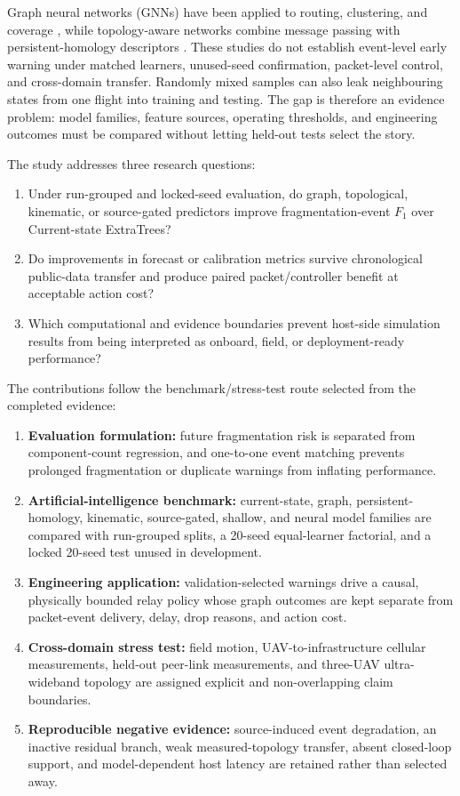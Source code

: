 \documentclass[final,5p,times,twocolumn]{elsarticle}
\begin{document}
Graph neural networks (GNNs) have been applied to routing, clustering, and coverage
\cite{lu2023uav,song2025gnnppor,ye2022multi}, while topology-aware networks combine
message passing with persistent-homology descriptors
\cite{hofer2017deep,carriere2020perslay}. These studies do not establish
event-level early warning under matched learners, unused-seed confirmation, packet-level
control, and cross-domain transfer. Randomly mixed samples can also leak neighbouring states
from one flight into training and testing. The gap is therefore an evidence problem: model
families, feature sources, operating thresholds, and engineering outcomes must be compared
without letting held-out tests select the story.

The study addresses three research questions:
\begin{enumerate}
  \item Under run-grouped and locked-seed evaluation, do graph, topological, kinematic, or
  source-gated predictors improve fragmentation-event $F_1$ over Current-state ExtraTrees?
  \item Do improvements in forecast or calibration metrics survive chronological public-data
  transfer and produce paired packet/controller benefit at acceptable action cost?
  \item Which computational and evidence boundaries prevent host-side simulation results from
  being interpreted as onboard, field, or deployment-ready performance?
\end{enumerate}

The contributions follow the benchmark/stress-test route selected from the completed
evidence:
\begin{enumerate}
  \item \textbf{Evaluation formulation:} future fragmentation risk is separated from
  component-count regression, and one-to-one event matching prevents prolonged fragmentation
  or duplicate warnings from inflating performance.
  \item \textbf{Artificial-intelligence benchmark:} current-state, graph,
  persistent-homology, kinematic, source-gated, shallow, and neural model families are
  compared with run-grouped splits, a 20-seed equal-learner factorial, and a locked 20-seed
  test unused in development.
  \item \textbf{Engineering application:} validation-selected warnings drive a causal,
  physically bounded relay policy whose graph outcomes are kept separate from packet-event
  delivery, delay, drop reasons, and action cost.
  \item \textbf{Cross-domain stress test:} field motion, UAV-to-infrastructure cellular
  measurements, held-out peer-link measurements, and three-UAV ultra-wideband topology are
  assigned explicit and non-overlapping claim boundaries.
  \item \textbf{Reproducible negative evidence:} source-induced event degradation, an
  inactive residual branch, weak measured-topology transfer, absent closed-loop support, and
  model-dependent host latency are retained rather than selected away.
\end{enumerate}
\end{document}
